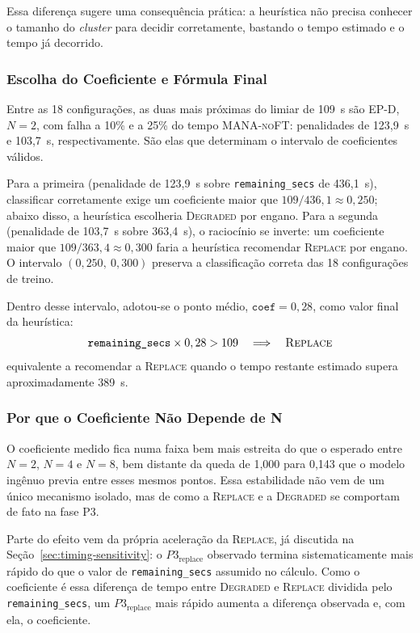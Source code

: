 Essa diferença sugere uma consequência prática: a heurística não precisa conhecer o
tamanho do \textit{cluster} para decidir corretamente, bastando o tempo estimado e o
tempo já decorrido.

\subsubsection{Escolha do Coeficiente e Fórmula Final}

Entre as 18 configurações, as duas mais próximas do limiar de 109~s são \textsc{EP-D},
$N=2$, com falha a 10\% e a 25\% do tempo \textsc{MANA-noFT}: penalidades de 123,9~s e
103,7~s, respectivamente. São elas que determinam o intervalo de coeficientes válidos.

Para a primeira (penalidade de 123,9~s sobre \texttt{remaining\_secs} de 436,1~s),
classificar corretamente exige um coeficiente maior que $109/436,1 \approx 0,250$;
abaixo disso, a heurística escolheria \textsc{Degraded} por engano. Para a segunda
(penalidade de 103,7~s sobre 363,4~s), o raciocínio se inverte: um coeficiente maior
que $109/363,4 \approx 0,300$ faria a heurística recomendar \textsc{Replace} por
engano. O intervalo $(0,250,\ 0,300)$ preserva a classificação correta das 18
configurações de treino.

Dentro desse intervalo, adotou-se o ponto médio, $\texttt{coef} = 0,28$, como valor
final da heurística:
\[
\texttt{remaining\_secs} \times 0,28 > 109 \quad\Longrightarrow\quad \textsc{Replace}
\]
equivalente a recomendar a \textsc{Replace} quando o tempo restante estimado supera
aproximadamente 389~s.

\subsubsection{Por que o Coeficiente Não Depende de N}

O coeficiente medido fica numa faixa bem mais estreita do que o esperado entre
$N=2$, $N=4$ e $N=8$, bem distante da queda de 1,000 para 0,143 que o modelo ingênuo
previa entre esses mesmos pontos. Essa estabilidade não vem de um único mecanismo
isolado, mas de como a \textsc{Replace} e a \textsc{Degraded} se comportam de fato na
fase P3.

Parte do efeito vem da própria aceleração da \textsc{Replace}, já discutida na
Seção~\ref{sec:timing-sensitivity}: o $P3_{\text{replace}}$ observado termina
sistematicamente mais rápido do que o valor de \texttt{remaining\_secs} assumido no
cálculo.
Como o coeficiente é essa diferença de tempo entre \textsc{Degraded} e
\textsc{Replace} dividida pelo \texttt{remaining\_secs}, um $P3_{\text{replace}}$
mais rápido aumenta a diferença observada e, com ela, o coeficiente.

